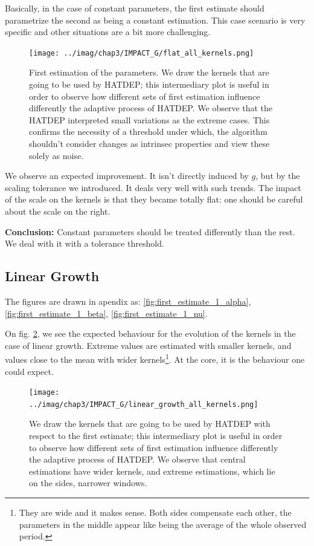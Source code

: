 \documentclass[11pt]{book}
\begin{document}
Basically, in the case of constant parameters, the first estimate should parametrize the second as being a constant estimation. This case scenario is very specific and other situations are a bit more challenging.

\begin{figure}
\centering
\texttt{[image: ../imag/chap3/IMPACT\_G/flat\_all\_kernels.png]}
\caption{First estimation of the parameters. We draw the kernels that are going to be used by HATDEP; this intermediary plot is useful in order to observe how different sets of first estimation influence differently the adaptive process of HATDEP. We observe that the HATDEP interpreted small variations as the extreme cases. This confirms the necessity of a threshold under which, the algorithm shouldn't consider changes as intrinsec properties and view these solely as noise.}
\label{fig:impact_g_flat}
\end{figure}


We observe an expected improvement. It isn't directly induced by $g$, but by the scaling tolerance we introduced. It deals very well with such trends. The impact of the scale on the kernels is that they became totally flat: one should be careful about the scale on the right.

\textbf{Conclusion:} Constant parameters should be treated differently than the rest. We deal with it with a tolerance threshold.




\subsection{Linear Growth}
The figures are drawn in apendix as: \ref{fig:first_estimate_1_alpha}, \ref{fig:first_estimate_1_beta}, \ref{fig:first_estimate_1_nu}.

On fig. \ref{fig:impact_g_linear}, we see the expected behaviour for the evolution of the kernels in the case of linear growth. Extreme values are estimated with smaller kernels, and values close to the mean with wider kernels\footnote{They are wide and it makes sense. Both sides compensate each other, the parameters in the middle appear like being the average of the whole observed period.}. At the core, it is the behaviour one could expect.

\begin{figure}
\centering
\texttt{[image: ../imag/chap3/IMPACT\_G/linear\_growth\_all\_kernels.png]}
\caption{We draw the kernels that are going to be used by HATDEP with respect to the first estimate; this intermediary plot is useful in order to observe how different sets of first estimation influence differently the adaptive process of HATDEP. We observe that central estimations have wider kernels, and extreme estimations, which lie on the sides, narrower windows.}
\label{fig:impact_g_linear}
\end{figure}
\end{document}
